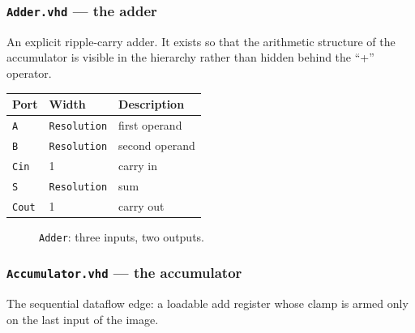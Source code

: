 \documentclass[11pt,a4paper]{article}
\begin{document}
\subsubsection{\texttt{Adder.vhd} --- the adder}
\label{sub:adder}

An explicit ripple-carry adder. It exists so that the arithmetic structure of the
accumulator is visible in the hierarchy rather than hidden behind the ``+''
operator.

\begin{center}
\small
\begin{tabularx}{\linewidth}{@{}llL@{}}
\toprule
\textbf{Port} & \textbf{Width} & \textbf{Description} \\
\midrule
\texttt{A}    & \texttt{Resolution} & first operand \\
\texttt{B}    & \texttt{Resolution} & second operand \\
\texttt{Cin}  & 1  & carry in \\
\texttt{S}    & \texttt{Resolution} & sum \\
\texttt{Cout} & 1  & carry out \\
\bottomrule
\end{tabularx}
\end{center}

\begin{figure}[H]
\centering
{}
\caption{\texttt{Adder}: three inputs, two outputs.}
\label{fig:adder}
\end{figure}

\subsubsection{\texttt{Accumulator.vhd} --- the accumulator}
\label{sub:acc}

The sequential dataflow edge: a loadable add register whose clamp is armed only
on the last input of the image.
\end{document}
